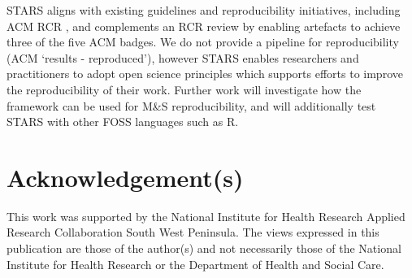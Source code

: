 \documentclass[]{interact}
\theoremstyle{plain}%
\theoremstyle{definition}
\theoremstyle{remark}
\begin{document}
STARS aligns with existing guidelines and reproducibility initiatives, including ACM RCR \citep{ACM_ArtifactReview}, and complements an RCR review by enabling artefacts to achieve three of the five ACM badges. We do not provide a pipeline for reproducibility (ACM `results - reproduced'), however STARS enables researchers and practitioners to adopt open science principles which supports efforts to improve the reproducibility of their work.  Further work will investigate how the framework can be used for M\&S reproducibility, and will additionally test STARS with other FOSS languages such as R. 

\section*{Acknowledgement(s)}

This work was supported by the National Institute for Health Research Applied Research Collaboration South West Peninsula. The views expressed in this publication are those of the author(s) and not necessarily those of the National Institute for Health Research or the Department of Health and Social Care.







\end{document}
